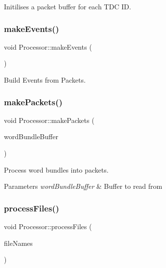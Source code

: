 Initilises a packet buffer for each T\+DC ID. 

\mbox{\label{class_processor_ae06672fc3ac6ef73525b64d4f9f769e7}} 
\subsubsection{\texorpdfstring{make\+Events()}{makeEvents()}}
{\footnotesize\ttfamily void Processor\+::make\+Events (\begin{DoxyParamCaption}{ }\end{DoxyParamCaption})\hspace{0.3cm}{\ttfamily [private]}}



Build Events from Packets. 

\mbox{\label{class_processor_a554de487c5e8205872151fbedb315291}} 
\subsubsection{\texorpdfstring{make\+Packets()}{makePackets()}}
{\footnotesize\ttfamily void Processor\+::make\+Packets (\begin{DoxyParamCaption}\item[{std\+::shared\+\_\+ptr$<$ \hyperlink{class_processor_a531b4c5f7c0d810fc6e9e1dd3d115725}{bundle\+Buffer} $>$}]{word\+Bundle\+Buffer }\end{DoxyParamCaption})\hspace{0.3cm}{\ttfamily [private]}}



Process word bundles into packets. 


\begin{DoxyParams}{Parameters}
{\em word\+Bundle\+Buffer} & Buffer to read from \\
\hline
\end{DoxyParams}
\mbox{\label{class_processor_a4186d391ddee1f68d763931dad346c4a}} 
\subsubsection{\texorpdfstring{process\+Files()}{processFiles()}}
{\footnotesize\ttfamily void Processor\+::process\+Files (\begin{DoxyParamCaption}\item[{const std\+::vector$<$ std\+::string $>$}]{file\+Names }\end{DoxyParamCaption})}

